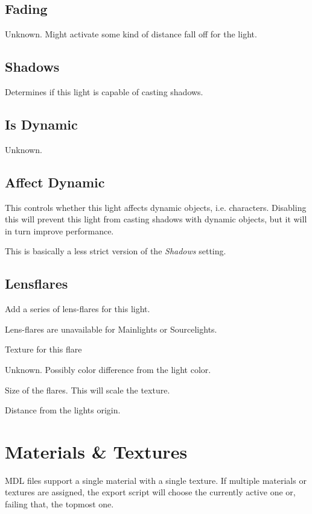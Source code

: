 \subsection*{Fading}
Unknown. Might activate some kind of distance fall off for the light.

\subsection*{Shadows}
Determines if this light is capable of casting shadows.

\subsection*{Is Dynamic}
Unknown.

\subsection*{Affect Dynamic}
This controls whether this light affects dynamic objects, i.e. characters.
Disabling this will prevent this light from casting shadows with dynamic
objects, but it will in turn improve performance.

This is basically a less strict version of the \textit{Shadows} setting.

\subsection*{Lensflares}
Add a series of lens-flares for this light.

Lens-flares are unavailable for Mainlights or Sourcelights.
\begin{description}[leftmargin=6em,style=nextline]
    \item[Texture] Texture for this flare
    \item[Colorshift] Unknown. Possibly color difference from the light color.
    \item[Size] Size of the flares. This will scale the texture.
    \item[Position] Distance from the lights origin.
\end{description}

\section{Materials \& Textures}
MDL files support a single material with a single texture. If multiple 
materials or textures are assigned, the export script will choose the currently 
active one or, failing that, the topmost one.

